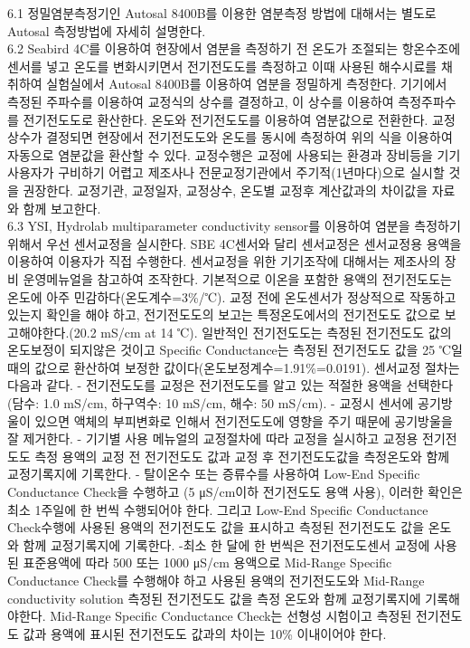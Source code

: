 \documentclass[
]{book}
\begin{document}
6.1 정밀염분측정기인 Autosal 8400B를 이용한 염분측정 방법에 대해서는 별도로 Autosal 측정방법에 자세히 설명한다.\\
6.2 Seabird 4C를 이용하여 현장에서 염분을 측정하기 전 온도가 조절되는 항온수조에 센서를 넣고 온도를 변화시키면서 전기전도도를 측정하고 이때 사용된 해수시료를 채취하여 실험실에서 Autosal 8400B를 이용하여 염분을 정밀하게 측정한다. 기기에서 측정된 주파수를 이용하여 교정식의 상수를 결정하고, 이 상수를 이용하여 측정주파수를 전기전도도로 환산한다. 온도와 전기전도도를 이용하여 염분값으로 전환한다. 교정 상수가 결정되면 현장에서 전기전도도와 온도를 동시에 측정하여 위의 식을 이용하여 자동으로 염분값을 환산할 수 있다. 교정수행은 교정에 사용되는 환경과 장비등을 기기 사용자가 구비하기 어렵고 제조사나 전문교정기관에서 주기적(1년마다)으로 실시할 것을 권장한다. 교정기관, 교정일자, 교정상수, 온도별 교정후 계산값과의 차이값을 자료와 함께 보고한다.\\
6.3 YSI, Hydrolab multiparameter conductivity sensor를 이용하여 염분을 측정하기 위해서 우선 센서교정을 실시한다. SBE 4C센서와 달리 센서교정은 센서교정용 용액을 이용하여 이용자가 직접 수행한다. 센서교정을 위한 기기조작에 대해서는 제조사의 장비 운영메뉴얼을 참고하여 조작한다. 기본적으로 이온을 포함한 용액의 전기전도도는 온도에 아주 민감하다(온도계수=3\%/℃). 교정 전에 온도센서가 정상적으로 작동하고 있는지 확인을 해야 하고, 전기전도도의 보고는 특정온도에서의 전기전도도 값으로 보고해야한다.(20.2 mS/cm at 14 ℃). 일반적인 전기전도도는 측정된 전기전도도 값의 온도보정이 되지않은 것이고 Specific Conductance는 측정된 전기전도도 값을 25 ℃일 때의 값으로 환산하여 보정한 값이다(온도보정계수=1.91\%=0.0191).
센서교정 절차는 다음과 같다.
- 전기전도도를 교정은 전기전도도를 알고 있는 적절한 용액을 선택한다(담수: 1.0 mS/cm, 하구역수: 10 mS/cm, 해수: 50 mS/cm).
- 교정시 센서에 공기방울이 있으면 액체의 부피변화로 인해서 전기전도도에 영향을 주기 때문에 공기방울을 잘 제거한다.
- 기기별 사용 메뉴얼의 교정절차에 따라 교정을 실시하고 교정용 전기전도도 측정 용액의 교정 전 전기전도도 값과 교정 후 전기전도도값을 측정온도와 함께 교정기록지에 기록한다.
- 탈이온수 또는 증류수를 사용하여 Low-End Specific Conductance Check을 수행하고 (5 μS/cm이하 전기전도도 용액 사용), 이러한 확인은 최소 1주일에 한 번씩 수행되어야 한다. 그리고 Low-End Specific Conductance Check수행에 사용된 용액의 전기전도도 값을 표시하고 측정된 전기전도도 값을 온도와 함께 교정기록지에 기록한다.
-최소 한 달에 한 번씩은 전기전도도센서 교정에 사용된 표준용액에 따라 500 또는 1000 μS/cm 용액으로 Mid-Range Specific Conductance Check를 수행해야 하고 사용된 용액의 전기전도도와 Mid-Range conductivity solution 측정된 전기전도도 값을 측정 온도와 함께 교정기록지에 기록해야한다. Mid-Range Specific Conductance Check는 선형성 시험이고 측정된 전기전도도 값과 용액에 표시된 전기전도도 값과의 차이는 10\% 이내이어야 한다.
\end{document}
